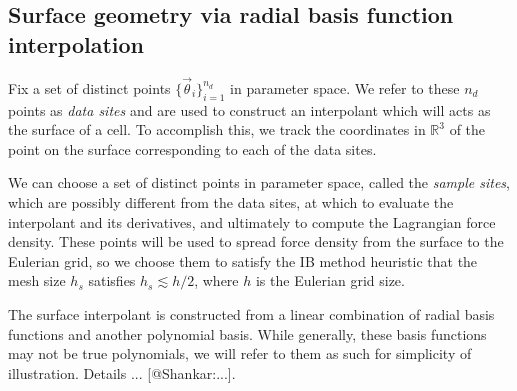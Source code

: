 \subsection{Surface geometry via radial basis function interpolation}

Fix a set of distinct points $\{\vec{\theta}_i\}_{i=1}^{n_d}$ in parameter
space. We refer to these $n_d$ points as \textit{data sites} and are used to
construct an interpolant which will acts as the surface of a cell. To
accomplish this, we track the coordinates in $\mathbb{R}^3$ of the point on the
surface corresponding to each of the data sites.

We can choose a set of distinct points in parameter space, called the
\textit{sample sites}, which are possibly different from the data sites, at
which to evaluate the interpolant and its derivatives, and ultimately to
compute the Lagrangian force density. These points will be used to spread force
density from the surface to the Eulerian grid, so we choose them to satisfy the
IB method heuristic that the mesh size $h_s$ satisfies $h_s \lesssim h/2$,
where $h$ is the Eulerian grid size.

The surface interpolant is constructed from a linear combination of radial
basis functions and another polynomial basis. While generally, these basis
functions may not be true polynomials, we will refer to them as such for 
simplicity of illustration. Details ... [@Shankar:...].

